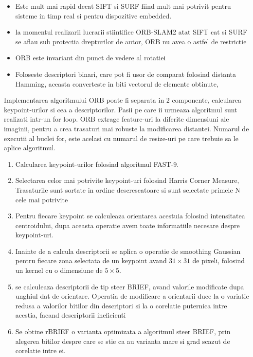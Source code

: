 \documentclass[12pt,a4paper]{report}
\begin{document}
\begin{itemize}
    \item Este mult mai rapid decat SIFT si SURF fiind mult mai potrivit pentru sisteme
in timp real si pentru dispozitive embedded.
    \item la momentul realizarii lucrarii stiintifice ORB-SLAM2 atat SIFT cat 
si SURF se aflau sub protectia drepturilor de autor, ORB nu avea o astfel de restrictie
    \item ORB este invariant din punct de vedere al rotatiei   
    \item Foloseste descriptori binari, care pot fi usor de comparat folosind distanta Hamming,
    aceasta converteste in biti vectorul de elemente obtinute, 
\end{itemize}
Implementarea algoritmului ORB poate fi separata in 2 componente, calcularea keypoint-urilor si 
cea a descriptorilor. Pasii pe care ii urmeaza algoritmul sunt realizati intr-un for loop.
ORB extrage feature-uri la diferite dimensiuni ale imaginii, pentru a crea trasaturi mai
robuste la modificarea distantei. Numarul de executii al buclei for, este acelasi cu numarul de 
resize-uri pe care trebuie sa le aplice algoritmul. 
\begin{enumerate}
    \item Calcularea keypoint-urilor folosind algoritmul FAST-9.
    \item Selectarea celor mai potrivite keypoint-uri folosind Harris Corner Measure, Trasaturile
sunt sortate in ordine descrescatoare si sunt selectate primele N cele mai potrivite
    \item Pentru fiecare keypoint se calculeaza orientarea acestuia folosind intensitatea
centroidului, dupa aceasta operatie avem toate informatiile necesare despre keypoint-uri.
    \item Inainte de a calcula descriptorii se aplica o operatie de smoothing Gaussian pentru fiecare 
zona selectata de un keypoint avand  $ 31 \times 31 $ de pixeli, folosind un kernel cu o dimensiune de $ 5 \times 5 $.
    \item se calculeaza descriptorii de tip steer BRIEF, avand valorile modificate dupa unghiul
dat de orientare. Operatia de modificare a orientarii duce la o variatie redusa a valorilor 
bitilor din descriptori si la o corelatie puternica intre acestia, facand descriptorii ineficienti
    \item Se obtine rBRIEF o varianta optimizata a algoritmul steer BRIEF, prin alegerea bitilor
despre care se stie ca au varianta mare si grad scazut de corelatie intre ei.
\end{enumerate}   
\end{document}
